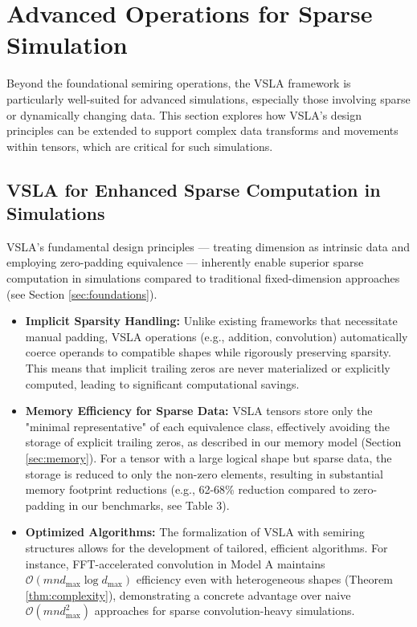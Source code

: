 \section{Advanced Operations for Sparse Simulation}
\label{sec:advanced_ops}

Beyond the foundational semiring operations, the VSLA framework is particularly well-suited for advanced simulations, especially those involving sparse or dynamically changing data. This section explores how VSLA's design principles can be extended to support complex data transforms and movements within tensors, which are critical for such simulations.

\subsection{VSLA for Enhanced Sparse Computation in Simulations}

VSLA's fundamental design principles — treating dimension as intrinsic data and employing zero-padding equivalence — inherently enable superior sparse computation in simulations compared to traditional fixed-dimension approaches (see Section \ref{sec:foundations}).

\begin{itemize}
    \item \textbf{Implicit Sparsity Handling:} Unlike existing frameworks that necessitate manual padding, VSLA operations (e.g., addition, convolution) automatically coerce operands to compatible shapes while rigorously preserving sparsity. This means that implicit trailing zeros are never materialized or explicitly computed, leading to significant computational savings.
    \item \textbf{Memory Efficiency for Sparse Data:} VSLA tensors store only the "minimal representative" of each equivalence class, effectively avoiding the storage of explicit trailing zeros, as described in our memory model (Section \ref{sec:memory}). For a tensor with a large logical shape but sparse data, the storage is reduced to only the non-zero elements, resulting in substantial memory footprint reductions (e.g., 62-68\% reduction compared to zero-padding in our benchmarks, see Table 3).
    \item \textbf{Optimized Algorithms:} The formalization of VSLA with semiring structures allows for the development of tailored, efficient algorithms. For instance, FFT-accelerated convolution in Model A maintains $\mathcal{O}(mnd_{\max}\log d_{\max})$ efficiency even with heterogeneous shapes (Theorem \ref{thm:complexity}), demonstrating a concrete advantage over naive $\mathcal{O}(mnd_{\max}^{2})$ approaches for sparse convolution-heavy simulations.
\end{itemize}

